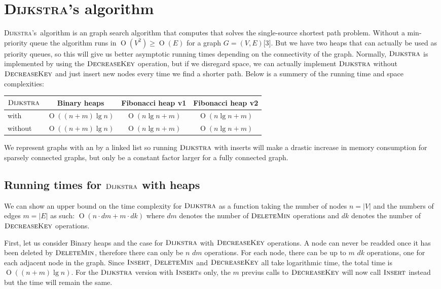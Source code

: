 \documentclass[oneside,11pt,openright]{report}
\newcommand{\BigO}[1]{\ensuremath{\operatorname{O}\left(#1\right)}}
\newcommand{\Insert}{\textsc{Insert}}
\newcommand{\DeleteMin}{\textsc{DeleteMin}}
\newcommand{\DecreaseKey}{\textsc{DecreaseKey}}
\newcommand{\Dijkstra}{\textsc{Dijkstra}}
\begin{document}
\chapter{\Dijkstra's algorithm}

\Dijkstra's~algorithm is an graph search algorithm that computes that solves the single-source shortest path problem. Without a min-priority queue the algorithm runs in $\BigO{V^2} \ge \BigO{E}$ for a graph $G=(V, E)$[3]. But we have two heaps that can actually be used as priority queues, so this will give us better asymptotic running times depending on the connectivity of the graph.
Normally, $\Dijkstra$ is implemented by using the $\DecreaseKey$ operation, but if we disregard space, we can actually implement $\Dijkstra$ without $\DecreaseKey$ and just insert new nodes every time we find a shorter path. Below is a summery of the running time and space complexities:

\begin{center}
  \begin{tabular}{ l | c | c | c}
    $\Dijkstra$ & Binary heaps & Fibonacci heap v1 & Fibonacci heap v2 \\ \hline
    with & $\BigO{(n+m)\lg n}$ & $\BigO{n\lg n + m}$ & $\BigO{n\lg n + m}$ \\
    without & $\BigO{(n+m)\lg n}$ & $\BigO{n\lg n + m}$ & $\BigO{n\lg n + m}$ \\     
  \end{tabular}
\end{center}

We represent graphs with an by a linked list so running $\Dijkstra$ with inserts will make a drastic increase in memory consumption for sparsely connected graphs, but only be a constant factor larger for a fully connected graph.

\section{Running times for $\Dijkstra$ with heaps}

We can show an upper bound on the time complexity for $\Dijkstra$ as a function taking the number of nodes $n=|V|$ and the numbers of edges $m=|E|$ as such: $\BigO{n \cdot dm + m \cdot dk}$ where $dm$ denotes the number of $\DeleteMin$ operations and $dk$ denotes the number of $\DecreaseKey$ operations.

First, let us consider Binary heaps and the case for $\Dijkstra$ with $\DecreaseKey$ operations. A node can never be readded once it has been deleted by $\DeleteMin$, therefore there can only be $n$ $dm$ operations. For each node, there can be up to $m$ $dk$ operations, one for each adjacent node in the graph. Since $\Insert$, $\DeleteMin$ and $\DecreaseKey$ all take logarithmic time, the total time is $\BigO{(n+m)\lg n}$. For the $\Dijkstra$ version with $\Insert$s only, the $m$ previus calls to $\DecreaseKey$ will now call $\Insert$ instead but the time will remain the same.
\end{document}
